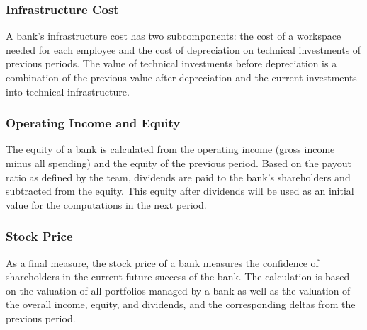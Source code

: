 \subsubsection{Infrastructure Cost}
A bank's infrastructure cost has two subcomponents: the cost of a workspace needed for each employee and the cost of depreciation on technical investments of previous periods. The value of technical investments before depreciation is a combination of the previous value after depreciation and the current investments into technical infrastructure.

\subsubsection{Operating Income and Equity}
The equity of a bank is calculated from the operating income (gross income minus all spending) and the equity of the previous period. Based on the payout ratio as defined by the team, dividends are paid to the bank's shareholders and subtracted from the equity. This equity after dividends will be used as an initial value for the computations in the next period.

\subsubsection{Stock Price}
As a final measure, the stock price of a bank measures the confidence of shareholders in the current future success of the bank. The calculation is based on the valuation of all portfolios managed by a bank as well as the valuation of the overall income, equity, and dividends, and the corresponding deltas from the previous period.
